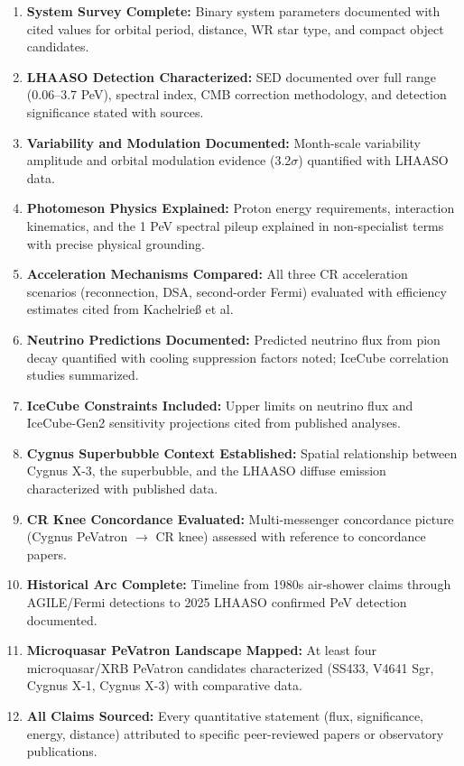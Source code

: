 \documentclass[11pt,letterpaper]{article}
\begin{document}
\begin{enumerate}
  \item \textbf{System Survey Complete:} Binary system parameters documented with cited values for orbital period, distance, WR star type, and compact object candidates.
  \item \textbf{LHAASO Detection Characterized:} SED documented over full range (0.06--3.7 PeV), spectral index, CMB correction methodology, and detection significance stated with sources.
  \item \textbf{Variability and Modulation Documented:} Month-scale variability amplitude and orbital modulation evidence (3.2$\sigma$) quantified with LHAASO data.
  \item \textbf{Photomeson Physics Explained:} Proton energy requirements, interaction kinematics, and the 1 PeV spectral pileup explained in non-specialist terms with precise physical grounding.
  \item \textbf{Acceleration Mechanisms Compared:} All three CR acceleration scenarios (reconnection, DSA, second-order Fermi) evaluated with efficiency estimates cited from Kachelrieß et al.
  \item \textbf{Neutrino Predictions Documented:} Predicted neutrino flux from pion decay quantified with cooling suppression factors noted; IceCube correlation studies summarized.
  \item \textbf{IceCube Constraints Included:} Upper limits on neutrino flux and IceCube-Gen2 sensitivity projections cited from published analyses.
  \item \textbf{Cygnus Superbubble Context Established:} Spatial relationship between Cygnus X-3, the superbubble, and the LHAASO diffuse emission characterized with published data.
  \item \textbf{CR Knee Concordance Evaluated:} Multi-messenger concordance picture (Cygnus PeVatron $\rightarrow$ CR knee) assessed with reference to concordance papers.
  \item \textbf{Historical Arc Complete:} Timeline from 1980s air-shower claims through AGILE/Fermi detections to 2025 LHAASO confirmed PeV detection documented.
  \item \textbf{Microquasar PeVatron Landscape Mapped:} At least four microquasar/XRB PeVatron candidates characterized (SS433, V4641 Sgr, Cygnus X-1, Cygnus X-3) with comparative data.
  \item \textbf{All Claims Sourced:} Every quantitative statement (flux, significance, energy, distance) attributed to specific peer-reviewed papers or observatory publications.
\end{enumerate}
\end{document}
